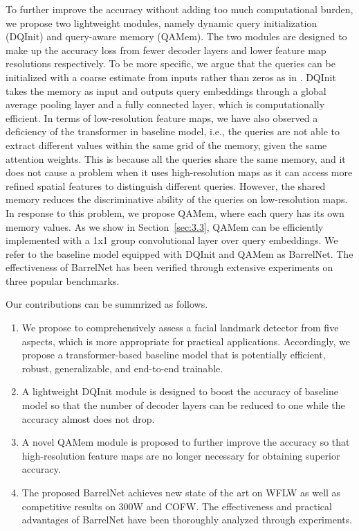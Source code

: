 \documentclass{article}
\begin{document}
To further improve the accuracy without adding too much computational burden, we propose two lightweight modules, namely dynamic query initialization (DQInit) and query-aware memory (QAMem). The two modules are designed to make up the accuracy loss from fewer decoder layers and lower feature map resolutions respectively. To be more specific, we argue that the queries can be initialized with a coarse estimate from inputs rather than zeros as in \citep{CMS20}. DQInit takes the memory as input and outputs  query embeddings through a global average pooling layer and a fully connected layer, which is computationally efficient. In terms of low-resolution feature maps, we have also observed a deficiency of the transformer in baseline model, i.e., the queries are not able to extract different values within the same grid of the memory, given the same attention weights. This is because all the queries share the same memory, and it does not cause a problem when it uses high-resolution maps as it can access more refined spatial features to distinguish different queries. However, the shared memory reduces the discriminative ability of the queries on low-resolution maps. In response to this problem, we propose QAMem, where each query has its own memory values. As we show in Section~\ref{sec:3.3}, QAMem can be efficiently implemented with a 1x1 group convolutional layer over query embeddings. We refer to the baseline model equipped with DQInit and QAMem as BarrelNet. The effectiveness of BarrelNet has been verified through extensive experiments on three popular benchmarks. 

Our contributions can be summrized as follows.

\begin{enumerate}
\item We propose to comprehensively assess a facial landmark detector from five aspects, which is more appropriate for practical applications. Accordingly, we propose a transformer-based baseline model that is potentially efficient, robust, generalizable, and end-to-end trainable.
\item A lightweight DQInit module is designed to boost the accuracy of baseline model so that the number of decoder layers can be reduced to one while the accuracy almost does not drop.
\item A novel QAMem module is proposed to further improve the accuracy so that high-resolution feature maps are no longer necessary for obtaining superior accuracy. 
\item The proposed BarrelNet achieves new state of the art on WFLW as well as competitive results on 300W and COFW. The effectiveness and practical advantages of BarrelNet have been thoroughly analyzed through experiments.
\end{enumerate}
 
\end{document}
